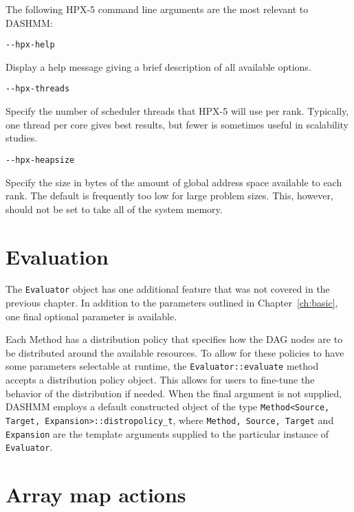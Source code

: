 The following HPX-5 command line arguments are the most relevant to DASHMM:

\begin{lstlisting}
--hpx-help
\end{lstlisting}

\noindent Display a help message giving a brief description of all
available options.

\begin{lstlisting}
--hpx-threads
\end{lstlisting}

\noindent Specify the number of scheduler threads that HPX-5 will use per rank.
Typically, one thread per core gives best results, but fewer is sometimes
useful in scalability studies.

\begin{lstlisting}
--hpx-heapsize
\end{lstlisting}

\noindent Specify the size in bytes of the amount of global address space
available to each rank. The default is frequently too low for large problem
sizes. This, however, should not be set to take all of the system memory.



\section{Evaluation}

The \texttt{Evaluator} object has one additional feature that was not
covered in the previous chapter. In addition to the parameters outlined
in Chapter~\ref{ch:basic}, one final optional parameter is available.

Each Method has a distribution policy that specifies how the DAG nodes are
to be distributed around the available resources. To allow for these policies
to have some parameters selectable at runtime, the
\texttt{Evaluator::evaluate} method accepts a distribution policy object.
This allows for users to fine-tune the behavior of the distribution if needed.
When the final argument is not supplied, DASHMM employs a default constructed
object of the type \texttt{Method<Source, Target, Expansion>::distropolicy\_t},
where \texttt{Method, Source, Target} and \texttt{Expansion} are the template
arguments supplied to the particular instance of \texttt{Evaluator}.



\section{Array map actions}

